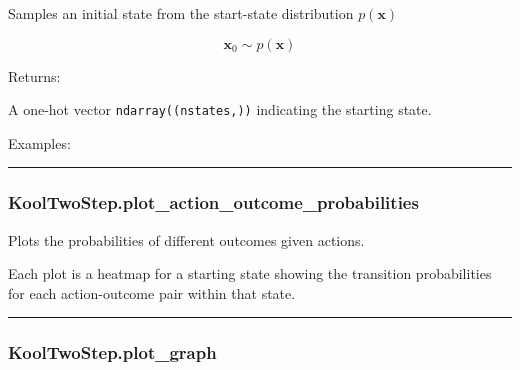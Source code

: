 Samples an initial state from the start-state distribution
\(p(\mathbf x)\)

\[
\mathbf x_0 \sim p(\mathbf x)
\]

Returns:

A one-hot vector \texttt{ndarray((nstates,))} indicating the starting
state.

Examples:

\begin{Shaded}
\begin{Highlighting}[]
\OperatorTok{=}
\end{Highlighting}
\end{Shaded}

\begin{center}\rule{0.5\linewidth}{\linethickness}\end{center}

\subsubsection{KoolTwoStep.plot\_action\_outcome\_probabilities}\label{kooltwostep.plot_action_outcome_probabilities}

\begin{Shaded}
\begin{Highlighting}[]
\OperatorTok{=}\OperatorTok{=}\OperatorTok{=}\OperatorTok{=}\NormalTok{)}
\end{Highlighting}
\end{Shaded}

Plots the probabilities of different outcomes given actions.

Each plot is a heatmap for a starting state showing the transition
probabilities for each action-outcome pair within that state.

\begin{center}\rule{0.5\linewidth}{\linethickness}\end{center}

\subsubsection{KoolTwoStep.plot\_graph}\label{kooltwostep.plot_graph}

\begin{Shaded}
\begin{Highlighting}[]
\OperatorTok{=}\OperatorTok{=}\OperatorTok{=}\OperatorTok{=}\OperatorTok{=}\OperatorTok{=}\OperatorTok{=}\OperatorTok{=}\NormalTok{)}
\end{Highlighting}
\end{Shaded}

